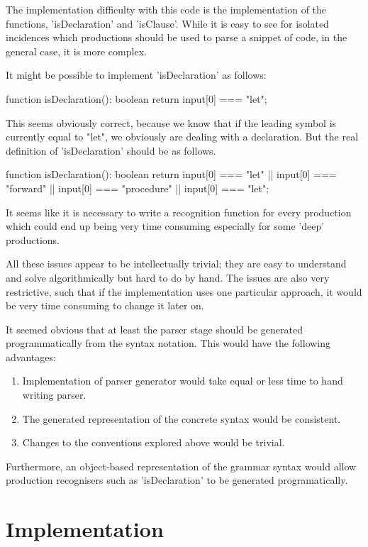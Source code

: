 \documentclass{article}
\begin{document}
The implementation difficulty with this code is the implementation of the functions, 'isDeclaration' and 'isClause'. While it is easy to see for isolated incidences which productions should be used to parse a snippet of code, in the general case, it is more complex.

It might be possible to implement 'isDeclaration' as follows:

function isDeclaration(): boolean {
	return input[0] === "let";
}

This seems obviously correct, because we know that if the leading symbol is currently equal to "let", we obviously are dealing with a declaration. But the real definition of 'isDeclaration' should be as follows.

function isDeclaration(): boolean {
	return input[0] === "let" || input[0] === "forward" || input[0] === "procedure" || input[0] === "let";
}

It seems like it is necessary to write a recognition function for every production which could end up being very time consuming especially for some 'deep' productions.

All these issues appear to be intellectually trivial; they are easy to understand and solve algorithmically but hard to do by hand. The issues are also very restrictive, such that if the implementation uses one particular approach, it would be very time consuming to change it later on.

It seemed obvious that at least the parser stage should be generated programmatically from the syntax notation. This would have the following advantages:

\begin{enumerate}
\item Implementation of parser generator would take equal or less time to hand writing parser.
\item The generated representation of the concrete syntax would be consistent.
\item Changes to the conventions explored above would be trivial.
\end{enumerate}

Furthermore, an object-based representation of the grammar syntax would allow production recognisers such as 'isDeclaration' to be generated programatically.


\section{Implementation}
\end{document}
